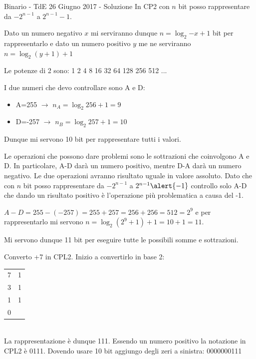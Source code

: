 \documentclass[handout]{beamer}
\begin{document}
\begin{frame}{Binario - TdE 26 Giugno 2017 - Soluzione}
	In CP2 con $n$ bit posso rappresentare da $-2^{n-1}$ a $2^{n-1}-1$.
	
	Dato un numero negativo $x$ mi serviranno dunque $n = \log_2{-x}+1$ bit per rappresentarlo e dato un numero positivo $y$ me ne serviranno $n = \log_2(y+1)+1$
	
	Le potenze di 2 sono: 1 2 4 8 16 32 64 128 256 512 ...
	
	I due numeri che devo controllare sono A e D:
	\begin{itemize}
		\item A=255 $\rightarrow$ $n_A = \log_2{256}+1 = 9$
		\item D=-257 $\rightarrow$ $n_B = \log_2{257}+1 = 10$
	\end{itemize}

	Dunque mi servono \alert{10 bit} per rappresentare tutti i valori.
	
	\framebreak
	
	Le operazioni che possono dare problemi sono le sottrazioni che coinvolgono A e D. In particolare, A-D darà un numero positivo, mentre D-A darà un numero negativo. Le due operazioni avranno risultato uguale in valore assoluto. Dato che con $n$ bit posso rappresentare da $-2^{n-1}$ a $2^{n-1}\alert{-1}$ controllo solo A-D che dando un risultato positivo è l'operazione più problematica a causa del \alert{-1}.
	
	$A-D=255-(-257) = 255+257 = 256+256 = 512 = 2^9$ e per rappresentarlo mi servono $n = \log_2(2^9+1)+1 = 10+1 = 11$.
	
	Mi servono dunque 11 bit per eseguire tutte le possibili somme e sottrazioni.
	
	\framebreak
	
	Converto +7 in CPL2. Inizio a convertirlo in base 2:
	\begin{tabular}{c|c}
		7 & 1\\
		3 & 1\\
		1 & 1\\
		0 & 
	\end{tabular}\\
	La rappresentazione è dunque 111. Essendo un numero positivo la notazione in CPL2 è 0111. Dovendo usare 10 bit aggiungo degli zeri a sinistra: 0000000111


\end{frame}
\end{document}

